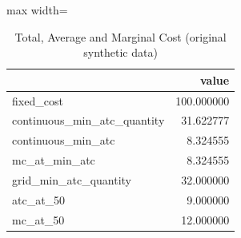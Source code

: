 \begin{table}[htbp]
\centering
\caption{Total, Average and Marginal Cost (original synthetic data)}
\begingroup
\small
\setlength{\tabcolsep}{6pt}
\renewcommand{\arraystretch}{1.12}
\begin{adjustbox}{max width=\linewidth}
\begin{tabular}{@{}lr@{}}
\toprule
 & value \\
\midrule
fixed\_cost & 100.000000 \\
continuous\_min\_atc\_quantity & 31.622777 \\
continuous\_min\_atc & 8.324555 \\
mc\_at\_min\_atc & 8.324555 \\
grid\_min\_atc\_quantity & 32.000000 \\
atc\_at\_50 & 9.000000 \\
mc\_at\_50 & 12.000000 \\
\bottomrule
\end{tabular}
\end{adjustbox}
\endgroup
\end{table}